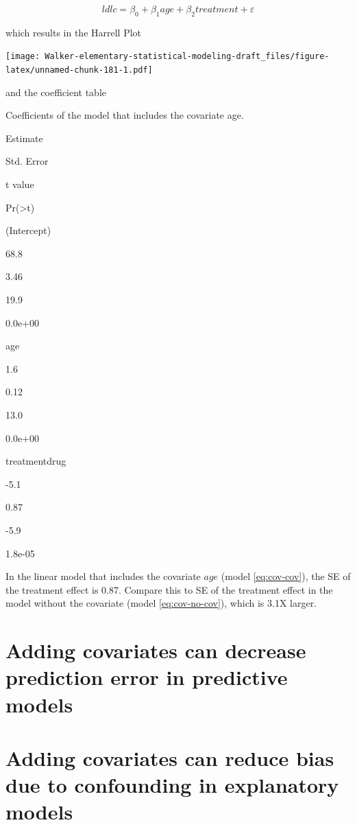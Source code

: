 \documentclass[]{book}
\begin{document}
\begin{equation}
ldlc = \beta_0 + \beta_1 age + \beta_2 treatment + \varepsilon
\label{eq:cov-cov}
\end{equation}

which results in the Harrell Plot

\texttt{[image: Walker-elementary-statistical-modeling-draft\_files/figure-latex/unnamed-chunk-181-1.pdf]}

and the coefficient table

\label{tab:unnamed-chunk-182}Coefficients of the model that includes the covariate age.

Estimate

Std. Error

t value

Pr(\textgreater\textbar t\textbar)

(Intercept)

68.8

3.46

19.9

0.0e+00

age

1.6

0.12

13.0

0.0e+00

treatmentdrug

-5.1

0.87

-5.9

1.8e-05

In the linear model that includes the covariate \(age\) (model \eqref{eq:cov-cov}), the SE of the treatment effect is 0.87. Compare this to SE of the treatment effect in the model without the covariate (model \eqref{eq:cov-no-cov}), which is 3.1X larger.

\hypertarget{adding-covariates-can-decrease-prediction-error-in-predictive-models}{%
\section{Adding covariates can decrease prediction error in predictive models}\label{adding-covariates-can-decrease-prediction-error-in-predictive-models}}

\hypertarget{adding-covariates-can-reduce-bias-due-to-confounding-in-explanatory-models}{%
\section{Adding covariates can reduce bias due to confounding in explanatory models}\label{adding-covariates-can-reduce-bias-due-to-confounding-in-explanatory-models}}
\end{document}
